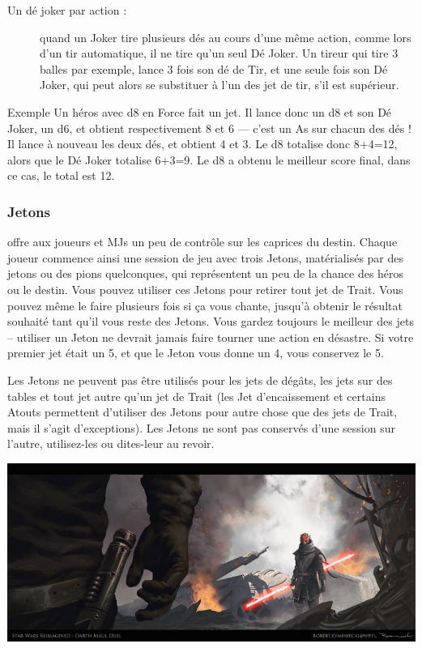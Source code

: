 \begin{description}
\item[Un dé joker par action :] quand un Joker tire plusieurs dés au cours d’une même action, comme lors d’un tir automatique, il ne tire qu’un seul Dé Joker. Un tireur qui tire 3 balles par exemple, lance 3 fois son dé de Tir, et une seule fois son Dé Joker, qui peut alors se substituer à l’un des jet de tir, s’il est supérieur.
\end{description}

\begin{commentbox}{Exemple}
Un héros avec d8 en Force fait un jet. Il lance donc un d8 et son Dé Joker, un d6, et obtient respectivement 8 et 6 — c’est un As sur chacun des dés ! Il lance à nouveau les deux dés, et obtient 4 et 3. Le d8 totalise donc 8+4=12, alors que le Dé Joker totalise 6+3=9. Le d8 a obtenu le meilleur score final, dans ce cas, le total est 12.
\end{commentbox}

\subsubsection{Jetons}
\swr offre aux joueurs et MJs un peu de contrôle sur les caprices du destin. Chaque joueur commence ainsi une session de jeu avec trois Jetons, matérialisés par des jetons ou des pions quelconques, qui représentent un peu de la chance des héros ou le destin. Vous pouvez utiliser ces Jetons pour retirer tout jet de Trait. Vous pouvez même le faire plusieurs fois si ça vous chante, jusqu’à obtenir le résultat souhaité tant qu’il vous reste des Jetons. Vous gardez toujours le meilleur des jets – utiliser un Jeton ne devrait jamais faire tourner une action en désastre. Si votre premier jet était un 5, et que le Jeton vous donne un 4, vous conservez le 5.

Les Jetons ne peuvent pas être utilisés pour les jets de dégâts, les jets sur des tables et tout jet autre qu’un jet de Trait (les Jet d’encaissement et certains Atouts permettent d’utiliser des Jetons pour autre chose que des jets de Trait, mais il s’agit d’exceptions). Les Jetons ne sont pas conservés d’une session sur l’autre, utilisez-les ou dites-leur au revoir.

\vspace*{\fill}
\hspace*{-0.5\columnsep}
\includegraphics[width=\textwidth]{img/regles/starwars_redesign.jpg}
\vspace*{\fill}

